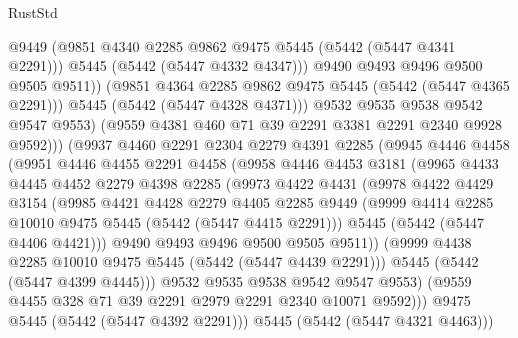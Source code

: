 \begin{lexlean}{RustStd}
\begin{coremodule}
{\begin{coremodule}
{{{{{{{{{{{{                        @9449
                        (@9851 @4340 @2285 @9862 @9475 @5445 (@5442 (@5447 @4341 @2291)))
                        @5445
                        (@5442 (@5447 @4332 @4347)))
                      @9490
                      @9493
                      @9496
                      @9500
                      @9505
                      @9511))
                  (@9851 @4364 @2285 @9862 @9475 @5445 (@5442 (@5447 @4365 @2291)))
                  @5445
                  (@5442 (@5447 @4328 @4371)))
                @9532
                @9535
                @9538
                @9542
                @9547
                @9553)
              (@9559 @4381 @460 @71 @39 @2291 @3381 @2291 @2340 @9928 @9592)))
          (@9937
            @4460
            @2291
            @2304
            @2279
            @4391
            @2285
            (@9945
              @4446
              @4458
              (@9951
                @4446
                @4455
                @2291
                @4458
                (@9958
                  @4446
                  @4453
                  @3181
                  (@9965
                    @4433
                    @4445
                    @4452
                    @2279
                    @4398
                    @2285
                    (@9973
                      @4422
                      @4431
                      (@9978
                        @4422
                        @4429
                        @3154
                        (@9985
                          @4421
                          @4428
                          @2279
                          @4405
                          @2285
                          @9449
                          (@9999 @4414 @2285 @10010 @9475 @5445 (@5442 (@5447 @4415 @2291)))
                          @5445
                          (@5442 (@5447 @4406 @4421)))
                        @9490
                        @9493
                        @9496
                        @9500
                        @9505
                        @9511))
                    (@9999 @4438 @2285 @10010 @9475 @5445 (@5442 (@5447 @4439 @2291)))
                    @5445
                    (@5442 (@5447 @4399 @4445)))
                  @9532
                  @9535
                  @9538
                  @9542
                  @9547
                  @9553)
                (@9559 @4455 @328 @71 @39 @2291 @2979 @2291 @2340 @10071 @9592)))
            @9475
            @5445
            (@5442 (@5447 @4392 @2291)))
          @5445
          (@5442 (@5447 @4321 @4463)))
}}}}}}}}}}}}
\end{coremodule}}
\end{coremodule}
\end{lexlean}
